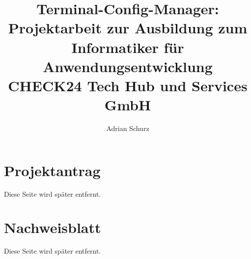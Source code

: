 \documentclass[a4paper,11pt,draft=false,bibliography=totoc]{scrartcl} %
\author{Adrian Schurz}
\title{Terminal-Config-Manager:\\
	Projektarbeit zur Ausbildung zum Informatiker für Anwendungsentwicklung\\
	CHECK24 Tech Hub und Services GmbH\\
	}
\begin{document}

\titlehead{\centering\texttt{[image: header.png]}}
\maketitle
{}
\newpage

\section{Projektantrag}
\begin{center}
	Diese Seite wird später entfernt.
\end{center}


\section{Nachweisblatt}
\begin{center}
	Diese Seite wird später entfernt.
\end{center}


\newpage
\tableofcontents
\newpage
















\newpage
\printbibliography

\newpage
\printglossaries
\end{document}
